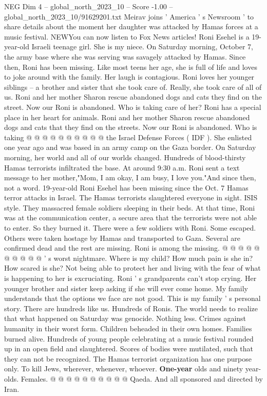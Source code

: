 \begin{textsample}{NEG Dim 4 – global\_north\_2023\_10 – Score -1.00 – global\_north\_2023\_10/91629201.txt}  \label{ex:f4_neg_001}
Meirav joins ' America ' s Newsroom ' to share details about the moment her daughter was attacked by Hamas forces at a music festival.
NEWYou can now listen to Fox News articles!
Roni Esehel is a 19-year-old Israeli teenage girl.
She is my niece.
On Saturday morning, October 7, the army base where she was serving was savagely attacked by Hamas.
Since then, Roni has been missing.
Like most teens her age, she is full of life and loves to joke around with the family.
Her laugh is contagious.
Roni loves her younger siblings -- a brother and sister that she took care of.
Really, she took care of all of us.
Roni and her mother Sharon rescue abandoned dogs and cats they find on the street.
Now our Roni is abandoned.
Who is taking care of her?
Roni has a special place in her heart for animals.
Roni and her mother Sharon rescue abandoned dogs and cats that they find on the streets.
Now our Roni is abandoned.
Who is taking @ @ @ @ @ @ @ @ @ @ the Israel Defense Forces ( IDF ).
She enlisted one year ago and was based in an army camp on the Gaza border.
On Saturday morning, her world and all of our worlds changed.
Hundreds of blood-thirsty Hamas terrorists infiltrated the base.
At around 9:30 a.m.
Roni sent a text message to her mother,"Mom, I am okay, I am busy, I love you."And since then, not a word. 19-year-old Roni Esehel has been missing since the Oct. 7 Hamas terror attacks in Israel.
The Hamas terrorists slaughtered everyone in sight.
ISIS style.
They massacred female soldiers sleeping in their beds.
At that time, Roni was at the communication center, a secure area that the terrorists were not able to enter.
So they burned it.
There were a few soldiers with Roni.
Some escaped.
Others were taken hostage by Hamas and transported to Gaza.
Several are confirmed dead and the rest are missing.
Roni is among the missing. @ @ @ @ @ @ @ @ @ @ ' s worst nightmare.
Where is my child?
How much pain is she in?
How scared is she?
Not being able to protect her and living with the fear of what is happening to her is excruciating.
Roni ' s grandparents can't stop crying.
Her younger brother and sister keep asking if she will ever come home.
My family understands that the options we face are not good.
This is my family ' s personal story.
There are hundreds like us.
Hundreds of Ronis.
The world needs to realize that what happened on Saturday was genocide.
Nothing less.
Crimes against humanity in their worst form.
Children beheaded in their own homes.
Families burned alive.
Hundreds of young people celebrating at a music festival rounded up in an open field and slaughtered.
Scores of bodies were mutilated, such that they can not be recognized.
The Hamas terrorist organization has one purpose only.
To kill Jews, wherever, whenever, whoever. \textbf{One-year} olds and ninety year-olds.
Females. @ @ @ @ @ @ @ @ @ @ Qaeda.
And all sponsored and directed by Iran.

\end{textsample}
